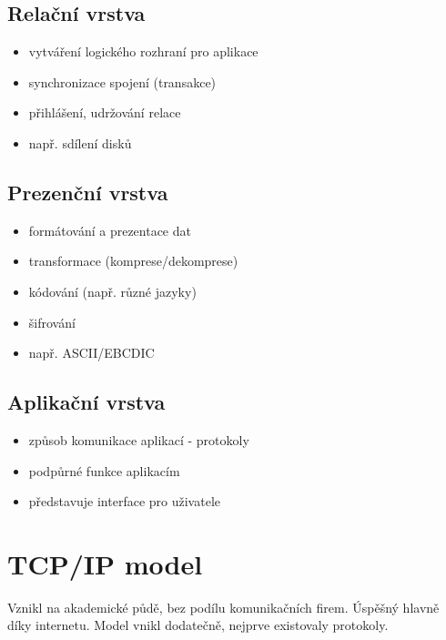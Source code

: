 \documentclass{szzclass}
\providecommand{\tightlist}{%
  \setlength{\itemsep}{0pt}\setlength{\parskip}{0pt}}
\begin{document}
\hypertarget{relaux10dnuxed-vrstva}{%
\subsection{Relační vrstva}\label{relaux10dnuxed-vrstva}}

\begin{itemize}
\tightlist
\item
  vytváření logického rozhraní pro aplikace
\item
  synchronizace spojení (transakce)
\item
  přihlášení, udržování relace
\item
  např. sdílení disků
\end{itemize}

\hypertarget{prezenux10dnuxed-vrstva}{%
\subsection{Prezenční vrstva}\label{prezenux10dnuxed-vrstva}}

\begin{itemize}
\tightlist
\item
  formátování a prezentace dat
\item
  transformace (komprese/dekomprese)
\item
  kódování (např. různé jazyky)
\item
  šifrování
\item
  např. ASCII/EBCDIC
\end{itemize}

\hypertarget{aplikaux10dnuxed-vrstva}{%
\subsection{Aplikační vrstva}\label{aplikaux10dnuxed-vrstva}}

\begin{itemize}
\tightlist
\item
  způsob komunikace aplikací - protokoly
\item
  podpůrné funkce aplikacím
\item
  představuje interface pro uživatele
\end{itemize}

\hypertarget{tcpip-model}{%
\section{TCP/IP model}\label{tcpip-model}}

Vznikl na akademické půdě, bez podílu komunikačních firem. Úspěšný
hlavně díky internetu. Model vnikl dodatečně, nejprve existovaly
protokoly.
\end{document}
